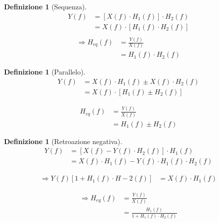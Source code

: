 \documentclass[a4paper,10pt]{article}
\theoremstyle{mystyle}
\newtheorem{definition}[theorem]{Definizione}
\begin{document}
\begin{definition}[Sequenza]
    \[
    \begin{aligned}
        Y(f)
        &= [X(f) \cdot H_1(f)] \cdot H_2(f) \\
        &= X(f) \cdot [H_1 (f) \cdot H_2 (f)] \\
    \end{aligned}
    \]
    \[
    \begin{aligned}
        \Rightarrow H_{eq} (f)
        &= \frac{Y(f)}{X(f)} \\
        &= H_1 (f) \cdot H_2 (f)
    \end{aligned}
    \]
\end{definition}

\begin{definition}[Parallelo]
    \[
        \begin{aligned}
            Y(f)
            &= X(f) \cdot H_1 (f) \pm X(f) \cdot H_2 (f) \\
            &= X(f) \cdot [H_1 (f) \pm H_2 (f)]
        \end{aligned}
    \]

    \[
        \begin{aligned}
            H_{eq} (f)
            &= \frac{Y(f)}{X(f)} \\
            &= H_1 (f) \pm H_2 (f)
        \end{aligned}
    \]
\end{definition}

\begin{definition}[Retroazione negativa]
    \[
        \begin{aligned}
            Y(f)
            &= [X(f) -Y(f) \cdot H_2 (f)] \cdot H_1(f) \\
            &= X(f) \cdot H_1 (f) - Y(f) \cdot H_1 (f) \cdot H_2 (f)
        \end{aligned}
    \]

    \[
        \begin{aligned}
            \Rightarrow Y(f) [1 + H_1 (f) \cdot H-2 (f)] 
            &= X(f) \cdot H_1(f)
        \end{aligned}
    \]

    \[
        \begin{aligned}
            \Rightarrow H_{eq} (f)
            &= \frac{Y(f)}{X(f)} \\
            &= \frac{H_1 (f)}{1 + H_1 (f) \cdot H_2 (f)}
        \end{aligned}
    \]
\end{definition}
\end{document}
